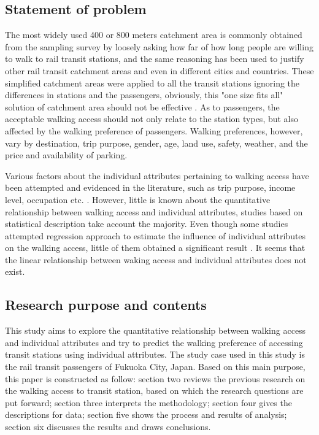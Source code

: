 \subsection{Statement of problem}
The most widely used 400 or 800 meters catchment area is commonly obtained from the sampling survey by loosely asking how far of how long people are willing to walk to rail transit stations, and the same reasoning has been used to justify other rail transit catchment areas and even in different cities and countries. These simplified catchment areas were applied to all the transit stations ignoring the differences in stations and the passengers, obviously, this "one size fits all" solution of catchment area should not be effective \cite{zhao2003forecasting,chia2016walking}. As to passengers, the acceptable walking access should not only relate to the station types, but also affected by the walking preference of passengers. Walking preferences, however, vary by destination, trip purpose, gender, age, land use, safety, weather, and the price and availability of parking. 

Various factors about the individual attributes pertaining to walking access have been attempted and evidenced in the literature, such as trip purpose, income level, occupation etc. \cite{alshalalfah2007case, weinstein2008far,chia2016walking}. However, little is known about the quantitative relationship between walking access and individual attributes, studies based on statistical description take account the majority. Even though some studies attempted regression approach to estimate the influence of individual attributes on the walking access, little of them obtained a significant result \cite{jiang2012walk,daniels2013explaining}. It seems that the linear relationship between waking access and individual attributes does not exist.

\subsection{Research purpose and contents}
This study aims to explore the quantitative relationship between walking access and individual attributes and try to predict the walking preference of accessing transit stations using individual attributes. The study case used in this study is the rail transit passengers of Fukuoka City, Japan. Based on this main purpose, this paper is constructed as follow: section two reviews the previous research on the walking access to transit station, based on which the research questions are put forward; section three interprets the methodology; section four gives the descriptions for data; section five shows the process and results of analysis; section six discusses the results and draws conclusions. 

